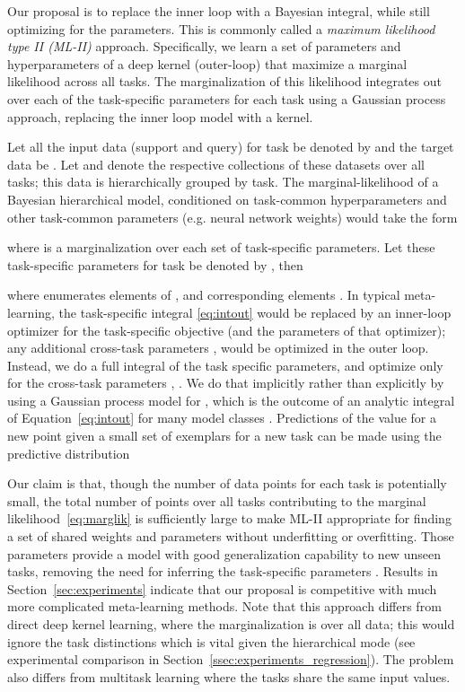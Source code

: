 \documentclass{article}
\begin{document}
Our proposal is to replace the inner loop with a Bayesian integral, while still optimizing for the parameters. This is commonly called a \emph{maximum likelihood type II (ML-II)} approach. Specifically, we learn a set of parameters and hyperparameters of a deep kernel (outer-loop) that maximize a marginal likelihood across all tasks. The marginalization of this likelihood integrates out over each of the task-specific parameters for each task using a Gaussian process approach, replacing the inner loop model with a kernel.

Let all the input data (support and query) for task  be denoted by  and the target data be . Let  and  denote the respective collections of these datasets over all tasks; this data is hierarchically grouped by task. The marginal-likelihood of a Bayesian hierarchical model, conditioned on task-common hyperparameters  and other task-common parameters  (e.g. neural network weights) would take the form

where  is a marginalization over each set of task-specific parameters. Let these task-specific parameters for task  be denoted by , then

where  enumerates elements of , and corresponding elements . 
In typical meta-learning, the task-specific integral \eqref{eq:intout} would be replaced by an inner-loop optimizer for the task-specific objective (and the parameters of that optimizer); any additional cross-task parameters ,  would be optimized in the outer loop. Instead, we do a full integral of the task specific parameters, and optimize only for the cross-task parameters , . We do that implicitly rather than explicitly by using a Gaussian process model for , which is the outcome of an analytic integral of Equation~\ref{eq:intout} for many model classes \citep{rasmussen2006gaussian}.
Predictions of the value  for a new point  given a small set of exemplars  for a new task  can be made using the predictive distribution


Our claim is that, though the number of data points for each task is potentially small, the total number of points over all tasks contributing to the marginal likelihood~\eqref{eq:marglik} is sufficiently large to make ML-II appropriate for finding a set of shared weights and parameters without underfitting or overfitting. Those parameters provide a model with good generalization capability to new unseen tasks, removing the need for inferring the task-specific parameters . Results in Section~\ref{sec:experiments} indicate that our proposal is competitive with much more complicated meta-learning methods. Note that this approach differs from direct deep kernel learning, where the marginalization is over all data; this would ignore the task distinctions which is vital given the hierarchical mode (see experimental comparison in Section~\ref{ssec:experiments_regression}). The problem also differs from multitask learning where the tasks share the same input values.
\end{document}
